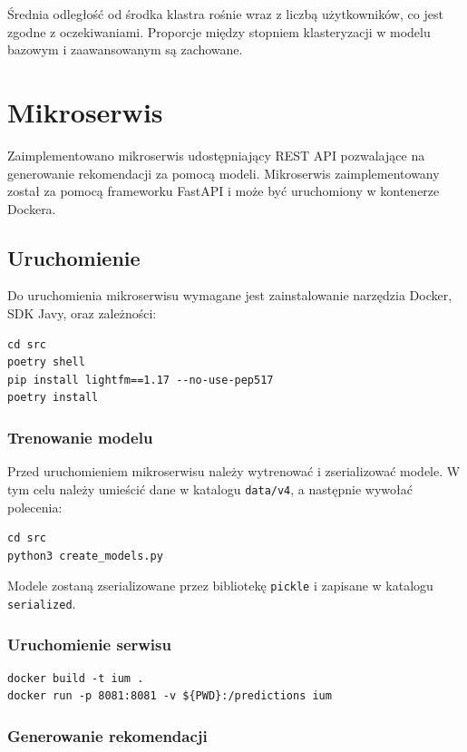 \documentclass[10pt,a4paper]{article}
\begin{document}
Średnia odległość od środka klastra rośnie wraz z liczbą użytkowników, co jest zgodne z oczekiwaniami. Proporcje między stopniem klasteryzacji w modelu bazowym i zaawansowanym są zachowane. 

\section{Mikroserwis}

Zaimplementowano mikroserwis udostępniający REST API pozwalające na generowanie rekomendacji za pomocą modeli. Mikroserwis zaimplementowany został za pomocą frameworku FastAPI i może być uruchomiony w kontenerze Dockera.

\subsection*{Uruchomienie}

Do uruchomienia mikroserwisu wymagane jest zainstalowanie narzędzia Docker, SDK Javy, oraz zależności:

\begin{verbatim}
cd src
poetry shell
pip install lightfm==1.17 --no-use-pep517
poetry install
\end{verbatim}

\subsubsection*{Trenowanie modelu}

Przed uruchomieniem mikroserwisu należy wytrenować i zserializować modele. W tym celu należy umieścić dane w katalogu \texttt{data/v4}, a następnie wywołać polecenia:

\begin{verbatim}
cd src
python3 create_models.py
\end{verbatim}

Modele zostaną zserializowane przez bibliotekę \texttt{pickle} i zapisane w katalogu \texttt{serialized}.

\subsubsection*{Uruchomienie serwisu}
\begin{verbatim}
docker build -t ium .
docker run -p 8081:8081 -v ${PWD}:/predictions ium
\end{verbatim}

\subsubsection*{Generowanie rekomendacji}
\end{document}
